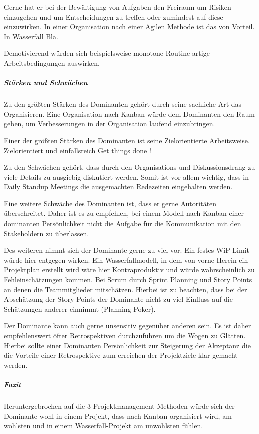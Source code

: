 \documentclass[twocolumn,10pt]{asme2ej}
\begin{document}
Gerne hat er bei der Bewältigung von Aufgaben den Freiraum um Risiken einzugehen und um Entscheidungen zu treffen oder zumindest auf diese einzuwirken. In einer Organisation nach einer Agilen Methode ist das von Vorteil. In Wasserfall Bla.

Demotivierend würden sich beispielsweise monotone Routine artige Arbeitsbedingungen auswirken.

\subparagraph{Stärken und Schwächen}

Zu den größten Stärken des Dominanten gehört durch seine sachliche Art das Organisieren. Eine Organisation nach Kanban würde dem Dominanten den Raum geben, um Verbesserungen in der Organisation laufend einzubringen. 

Einer der größten Stärken des Dominanten ist seine Zielorientierte Arbeitsweise. 
Zielorientiert und einfallsreich Get things done !

Zu den Schwächen gehört, dass durch den Organisations und Diskussionsdrang zu viele Details zu ausgiebig diskutiert werden. Somit ist vor allem wichtig, dass in Daily Standup Meetings die ausgemachten Redezeiten eingehalten werden. 

Eine weitere Schwäche des Dominanten ist, dass er gerne Autoritäten überschreitet. Daher ist es zu empfehlen, bei einem Modell nach Kanban einer dominanten Persönlichkeit nicht die Aufgabe für die Kommunikation mit den Stakeholdern zu überlassen.

Des weiteren nimmt sich der Dominante gerne zu viel vor. Ein festes WiP Limit würde hier entgegen wirken. Ein Wasserfallmodell, in dem von vorne Herein ein Projektplan erstellt wird wäre hier Kontraproduktiv und würde wahrscheinlich zu Fehleinschätzungen kommen. Bei Scrum durch Sprint Planning und Story Points an denen die Teammitglieder mitschätzen. Hierbei ist zu beachten, dass bei der Abschätzung der Story Points der Dominante nicht zu viel Einfluss auf die Schätzungen anderer einnimmt (Planning Poker).

Der Dominante kann auch gerne unsensitiv gegenüber anderen sein. Es ist daher empfehlenswert öfter Retrospektiven durchzuführen um die Wogen zu Glätten. Hierbei sollte einer Dominanten Persönlichkeit zur Steigerung der Akzeptanz die die Vorteile einer Retrospektive zum erreichen der Projektziele klar gemacht werden.

\subparagraph{Fazit}

Heruntergebrochen auf die 3 Projektmanagement Methoden würde sich der Dominante wohl in einem Projekt, dass nach Kanban organisiert wird, am wohlsten und in einem Wasserfall-Projekt am unwohlsten fühlen.
\end{document}
